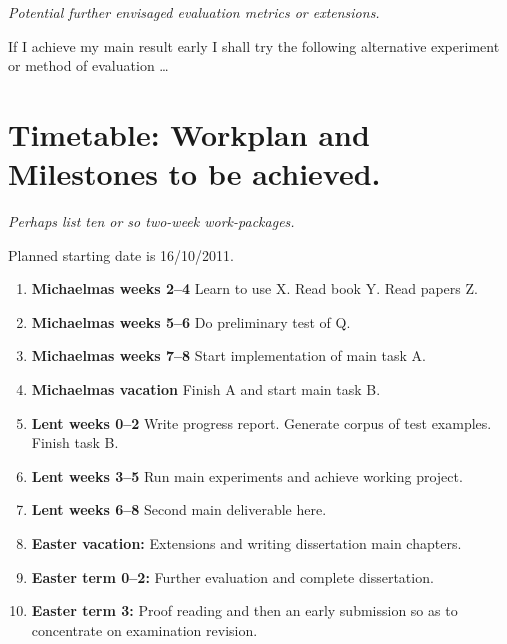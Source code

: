 \documentclass[12pt,a4paper,twoside]{article}
\begin{document}
{\em Potential further envisaged evaluation metrics or extensions.}

If I achieve my main result early I shall try the following
alternative experiment or method of evaluation \ldots


\section*{Timetable: Workplan and Milestones to be achieved.}


{\em Perhaps list ten or so  two-week work-packages.}

Planned starting date is 16/10/2011.

\begin{enumerate}

\item {\bf Michaelmas weeks 2--4} Learn to use X. Read book Y. Read papers Z.

\item {\bf Michaelmas weeks 5--6} Do preliminary test of Q.

\item {\bf Michaelmas weeks 7--8} Start implementation of main task A.

\item {\bf Michaelmas vacation} Finish A and start main task B.

\item {\bf Lent weeks 0--2} Write progress report. Generate corpus of
  test examples. Finish task B.

\item {\bf Lent weeks 3--5} Run main experiments and achieve working project.

\item {\bf Lent weeks 6--8} Second main deliverable here.

\item {\bf Easter vacation:} Extensions and writing dissertation main
  chapters.

\item {\bf Easter term 0--2:}  Further evaluation and complete dissertation.

\item {\bf Easter term 3:} Proof reading and then an early submission
  so as to concentrate on examination revision.

\end{enumerate}
\end{document}
